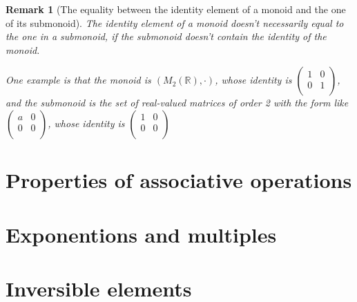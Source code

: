 \documentclass[onecolumn]{ctexart}
\newtheorem{remark}{Remark}
\begin{document}
\begin{remark}[The equality between the identity element of a monoid and the one of its submonoid]
  The identity element of a monoid doesn't necessarily equal to the one in a submonoid, if the submonoid doesn't contain the identity of the monoid.

  One example is that the monoid is $(M_2(\mathbb{R}), \cdot)$, whose identity is $
  \begin{pmatrix}
    1 & 0 \\
    0 & 1 \\
  \end{pmatrix}$, and the submonoid is the set of real-valued matrices of order 2 with the form like $
  \begin{pmatrix}
    a & 0 \\
    0 & 0 \\
  \end{pmatrix}$, whose identity is $
  \begin{pmatrix}
    1 & 0 \\
    0 & 0 \\
  \end{pmatrix}$
\end{remark}

\section{Properties of associative operations}

\section{Exponentions and multiples}

\section{Inversible elements}
\end{document}
